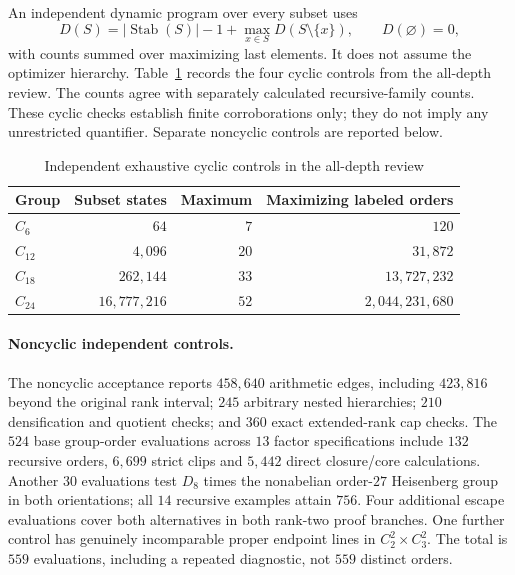 \documentclass[11pt,letterpaper]{article}
\theoremstyle{definition}\newtheorem{definition}{Definition}
\newcommand{\Stab}{\operatorname{Stab}}
\begin{document}
An independent dynamic program over every subset uses
\[
D(S)=|\Stab(S)|-1+\max_{x\in S}D(S\setminus\{x\}),\qquad D(\varnothing)=0,
\]
with counts summed over maximizing last elements. It does not assume the optimizer hierarchy. Table~\ref{tab:controls} records the four cyclic controls from the all-depth review. The counts agree with separately calculated recursive-family counts. These cyclic checks establish finite corroborations only; they do not imply any unrestricted quantifier. Separate noncyclic controls are reported below.

\begin{table}[htbp]\centering
\caption{Independent exhaustive cyclic controls in the all-depth review}\label{tab:controls}
\begin{tabular}{lrrr}\toprule
Group & Subset states & Maximum & Maximizing labeled orders\\\midrule
$C_6$ & $64$ & $7$ & $120$\\
$C_{12}$ & $4{,}096$ & $20$ & $31{,}872$\\
$C_{18}$ & $262{,}144$ & $33$ & $13{,}727{,}232$\\
$C_{24}$ & $16{,}777{,}216$ & $52$ & $2{,}044{,}231{,}680$\\\bottomrule
\end{tabular}\end{table}

\paragraph{Noncyclic independent controls.}
The noncyclic acceptance reports $458{,}640$ arithmetic edges, including $423{,}816$ beyond the original rank interval; $245$ arbitrary nested hierarchies; $210$ densification and quotient checks; and $360$ exact extended-rank cap checks. The $524$ base group-order evaluations across $13$ factor specifications include $132$ recursive orders, $6{,}699$ strict clips and $5{,}442$ direct closure/core calculations. Another $30$ evaluations test $D_8$ times the nonabelian order-$27$ Heisenberg group in both orientations; all $14$ recursive examples attain $756$. Four additional escape evaluations cover both alternatives in both rank-two proof branches. One further control has genuinely incomparable proper endpoint lines in $C_2^2\times C_3^2$. The total is $559$ evaluations, including a repeated diagnostic, not $559$ distinct orders.
\end{document}
